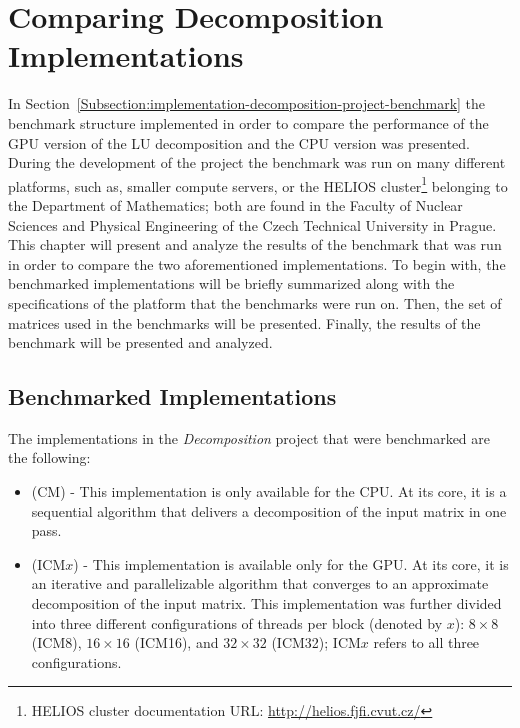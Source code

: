 \chapter{Comparing Decomposition Implementations \TO}\label{Chapter:comparing-decomposition-implementations}
In Section~\ref{Subsection:implementation-decomposition-project-benchmark} the benchmark structure implemented in order to compare the performance of the GPU version of the LU decomposition and the CPU version was presented. During the development of the project the benchmark was run on many different platforms, such as, smaller compute servers, or the HELIOS cluster\footnote{HELIOS cluster documentation URL: \url{http://helios.fjfi.cvut.cz/}} belonging to the Department of Mathematics; both are found in the Faculty of Nuclear Sciences and Physical Engineering of the Czech Technical University in Prague. This chapter will present and analyze the results of the benchmark that was run in order to compare the two aforementioned implementations. To begin with, the benchmarked implementations will be briefly summarized along with the specifications of the platform that the benchmarks were run on. Then, the set of matrices used in the benchmarks will be presented. Finally, the results of the benchmark will be presented and analyzed.

\section{Benchmarked Implementations \TO}\label{Section:comparing-decomposition-implementations-benchmarked-implementations}
The implementations in the \textit{Decomposition} project that were benchmarked are the following:

\begin{itemize}
	\item \textit{} (CM) - This implementation is only available for the CPU. At its core, it is a sequential algorithm that delivers a decomposition of the input matrix in one pass.
	\item \textit{} (ICM$ x $) - This implementation is available only for the GPU. At its core, it is an iterative and parallelizable algorithm that converges to an approximate decomposition of the input matrix. This implementation was further divided into three different configurations of threads per block (denoted by $ x $): $ 8\times 8 $ (ICM8), $ 16\times 16 $ (ICM16), and $ 32\times 32 $ (ICM32); ICM$ x $ refers to all three configurations.
\end{itemize}



